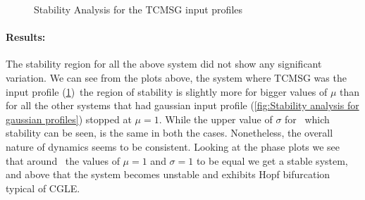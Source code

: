 \begin{figure}[H]
    \caption{Stability Analysis for the TCMSG input profiles}
    \label{fig:Stability analysis for TCMSG profiles}
\end{figure}


\paragraph{Results:}
The stability region for all the above system did not show any significant variation. We can see from the plots above, the system where TCMSG was the input profile (\ref{fig:Stability analysis for TCMSG profiles})\
the region of stability is slightly more for bigger values of $\mu$ than for all the other systems that had gaussian input profile (\ref{fig:Stability analysis for gaussian profiles}) stopped at $\mu=1$. While the upper value of $\sigma$ for \
which stability can be seen, is the same in both the cases. Nonetheless, the overall nature of dynamics seems to be consistent. Looking at the phase plots we see that around \
the values of $\mu =1$ and $\sigma=1$ to be equal we get a stable system, and above that the system becomes unstable and exhibits Hopf bifurcation typical of CGLE. 


